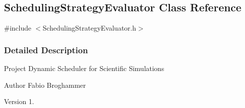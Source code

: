 \hypertarget{a00034}{}\subsection{Scheduling\+Strategy\+Evaluator Class Reference}
\label{a00034}


{\ttfamily \#include $<$Scheduling\+Strategy\+Evaluator.\+h$>$}



\subsubsection{Detailed Description}
Project Dynamic Scheduler for Scientific Simulations \begin{DoxyAuthor}{Author}
Fabio Broghammer 
\end{DoxyAuthor}
\begin{DoxyVersion}{Version}
1. 
\end{DoxyVersion}
